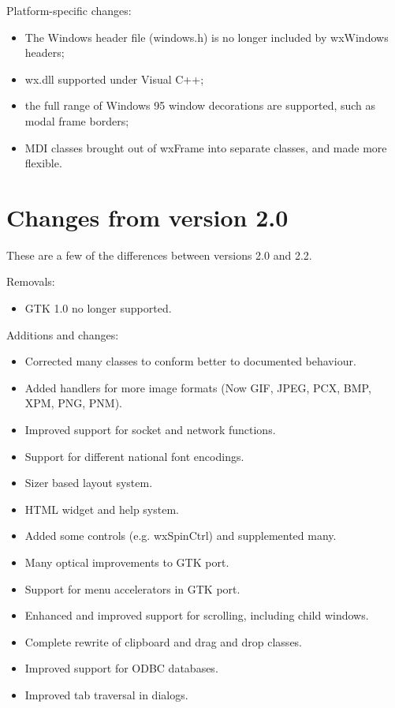 Platform-specific changes:

\begin{itemize}\itemsep=0pt
\item The Windows header file (windows.h) is no longer included by wxWindows headers;
\item wx.dll supported under Visual C++;
\item the full range of Windows 95 window decorations are supported, such as modal frame
borders;
\item MDI classes brought out of wxFrame into separate classes, and made more flexible.
\end{itemize}


\section{Changes from version 2.0}\label{versionchanges20}

These are a few of the differences between versions 2.0 and 2.2.

Removals:

\begin{itemize}\itemsep=0pt
\item GTK 1.0 no longer supported.
\end{itemize}

Additions and changes:

\begin{itemize}\itemsep=0pt
\item Corrected many classes to conform better to documented behaviour.
\item Added handlers for more image formats (Now GIF, JPEG, PCX, BMP, XPM, PNG, PNM).
\item Improved support for socket and network functions.
\item Support for different national font encodings.
\item Sizer based layout system.
\item HTML widget and help system.
\item Added some controls (e.g. wxSpinCtrl) and supplemented many.
\item Many optical improvements to GTK port.
\item Support for menu accelerators in GTK port.
\item Enhanced and improved support for scrolling, including child windows.
\item Complete rewrite of clipboard and drag and drop classes.
\item Improved support for ODBC databases.
\item Improved tab traversal in dialogs.
\end{itemize}


